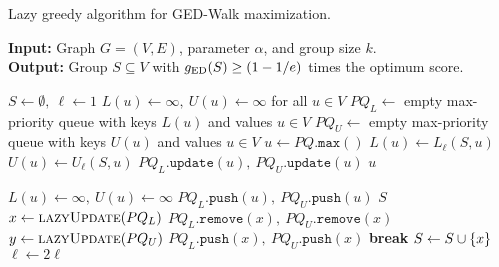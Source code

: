 \begin{algorithm}[t]
\footnotesize
{}
\caption{\footnotesize Lazy greedy algorithm for GED-Walk maximization.}
\label{algo:ged-lazy-greedy}
\textbf{Input:} Graph $G = (V, E)$, parameter $\alpha$, and group size $k$.\\
\textbf{Output:} Group $S \subseteq V$ with $g_{\text{ED}}(S) \ge (1 - 1/e)$ times the
optimum score.
\begin{algorithmic}[1]
\State$S \gets \emptyset,\ \ell \gets 1$
\State$L(u) \gets \infty,\ U(u) \gets \infty$ for all $u \in V$
\State$PQ_L \gets$ empty max-priority queue with keys $L(u)$ and values $u \in V$
\State$PQ_U \gets$ empty max-priority queue with keys $U(u)$ and values $u \in V$
\label{line:ged-greedy:proc}
\Repeat
\State$u \gets PQ.\texttt{max}()$
\State$L(u) \gets L_{\ell}(S, u)$
\State$U(u) \gets U_{\ell}(S, u)$
\State$PQ_L.\texttt{update}(u),\ PQ_U.\texttt{update}(u)$
\State\Return$u$
\EndProcedure\smallskip

\Loop
{}
\State$L(u) \gets \infty,\ U(u) \gets \infty$\label{line:ged-greedy:reset-LU}
\State$PQ_L.\texttt{push}(u),\ PQ_U.\texttt{push}(u)$
\EndFor
\Loop
{}
\State\Return$S$
\EndIf
\State$x \gets \textsc{lazyUpdate}(PQ_L)$
\State$PQ_L.\texttt{remove}(x),\ PQ_U.\texttt{remove}(x)$
\State$y \gets \textsc{lazyUpdate}(PQ_U)$
\label{line:ged-greedy:eps-sep-check}
\State$PQ_L.\texttt{push}(x),\ PQ_U.\texttt{push}(x)$
\State\textbf{break}
\EndIf
\State$S \gets S \cup \set{x}$\label{line:ged-greedy:add-x}
\EndLoop
\State$\ell \gets 2\ell$
\label{line:ged-greedy:inc-l}
\EndLoop
\end{algorithmic}
\end{algorithm}


